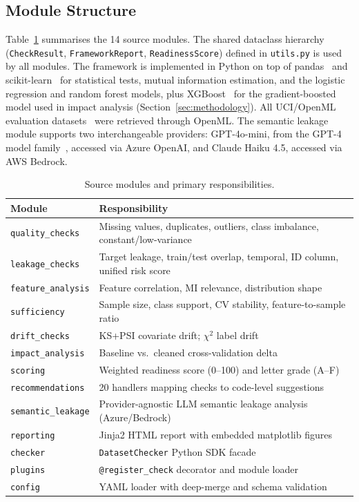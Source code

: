 \documentclass[11pt]{article}
\begin{document}
\subsection{Module Structure}

Table~\ref{tab:modules} summarises the 14 source modules.  The shared
dataclass hierarchy (\texttt{CheckResult}, \texttt{FrameworkReport},
\texttt{ReadinessScore}) defined in \texttt{utils.py} is used by all modules.
The framework is implemented in Python on top of
pandas~\cite{mckinney2010data} and scikit-learn~\cite{pedregosa2011scikit}
for statistical tests, mutual information estimation, and the logistic
regression and random forest models, plus
XGBoost~\cite{chen2016xgboost} for the gradient-boosted model used in
impact analysis (Section~\ref{sec:methodology}).  All UCI/OpenML
evaluation datasets~\cite{dua2017uci} were retrieved through OpenML.  The
semantic leakage module supports two interchangeable providers: GPT-4o-mini,
from the GPT-4 model
family~\cite{openai2023gpt4}, accessed via Azure OpenAI, and Claude Haiku 4.5,
accessed via AWS Bedrock.

\begin{table}[!h]
\centering
\caption{Source modules and primary responsibilities.}
\label{tab:modules}
\scriptsize
\begin{tabularx}{\columnwidth}{lX}
\toprule
\textbf{Module} & \textbf{Responsibility} \\
\midrule
\texttt{quality\_checks} & Missing values, duplicates, outliers, class imbalance, constant/low-variance \\
\texttt{leakage\_checks} & Target leakage, train/test overlap, temporal, ID column, unified risk score \\
\texttt{feature\_analysis} & Feature correlation, MI relevance, distribution shape \\
\texttt{sufficiency} & Sample size, class support, CV stability, feature-to-sample ratio \\
\texttt{drift\_checks} & KS+PSI covariate drift; $\chi^2$ label drift \\
\texttt{impact\_analysis} & Baseline vs.\ cleaned cross-validation delta \\
\texttt{scoring} & Weighted readiness score (0--100) and letter grade (A--F) \\
\texttt{recommendations} & 20 handlers mapping checks to code-level suggestions \\
\texttt{semantic\_leakage} & Provider-agnostic LLM semantic leakage analysis (Azure/Bedrock) \\
\texttt{reporting} & Jinja2 HTML report with embedded matplotlib figures \\
\texttt{checker} & \texttt{DatasetChecker} Python SDK facade \\
\texttt{plugins} & \texttt{@register\_check} decorator and module loader \\
\texttt{config} & YAML loader with deep-merge and schema validation \\
\bottomrule
\end{tabularx}
\end{table}
\end{document}
